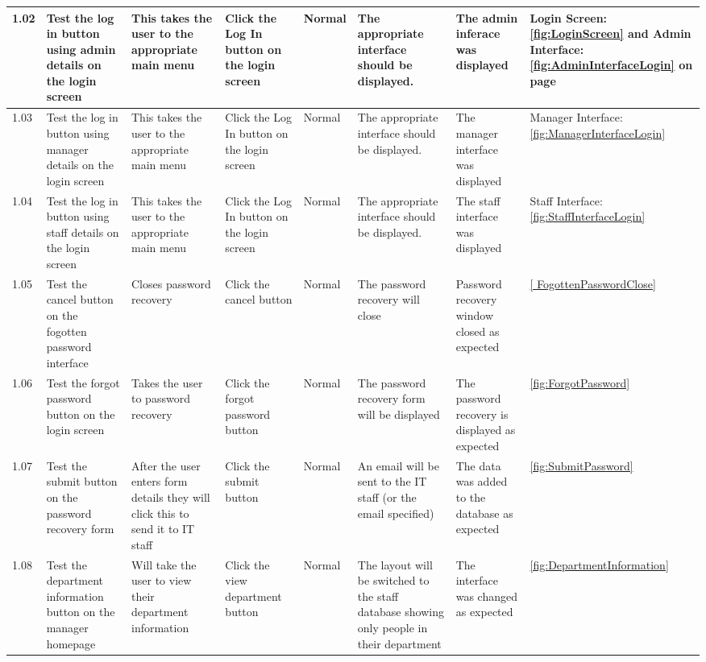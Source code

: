 \begin{landscape}
\begin{center}
\begin{longtable}{|p{1.5cm}|p{2cm}|p{2.5cm}|p{2cm}|p{2cm}|p{2cm}|p{3cm}|p{1.7cm}|}
\rowcolor{lightgray}1.02 & Test the log in button using admin details on the login screen  & This takes the user to the appropriate main menu & Click the Log In button on the login screen & Normal &  The appropriate interface should be displayed.&The admin inferace was displayed & Login Screen: \ref{fig:LoginScreen} and Admin Interface:  \ref{fig:AdminInterfaceLogin} on page \pageref{fig:LoginScreen} \\ \hline
\rowcolor{lightgray}1.03 & Test the log in button using manager details on the login screen  & This takes the user to the appropriate main menu & Click the Log In button on the login screen & Normal &  The appropriate interface should be displayed.& The manager interface was displayed & Manager Interface:  \ref{fig:ManagerInterfaceLogin}  \\ \hline
\rowcolor{lightgray}1.04 & Test the log in button using staff details on the login screen  & This takes the user to the appropriate main menu & Click the Log In button on the login screen & Normal &  The appropriate interface should be displayed.& The staff interface was displayed & Staff Interface:  \ref{fig:StaffInterfaceLogin}  \\ \hline
\rowcolor{lightgray}1.05 & Test the cancel button on the fogotten password interface & Closes password recovery & Click the cancel button & Normal & The password recovery will close & Password recovery window closed as expected & \ref{ FogottenPasswordClose}  \\ \hline
1.06 & Test the forgot password button on the login screen & Takes the user to password recovery & Click the forgot password button & Normal & The password recovery form will be displayed & The password recovery is displayed as expected& \ref{fig:ForgotPassword}  \\ \hline
1.07 & Test the submit button on the password recovery form & After the user enters form details they will click this to send it to IT staff & Click the submit button & Normal & An email will be sent to the IT staff (or the email specified) & The data was added to the database as expected &\ref{fig:SubmitPassword} \\ \hline
1.08 & Test the department information button on the manager homepage & Will take the user to view their department information & Click the view department button & Normal & The layout will be switched to the staff database showing only people in their department & The interface was changed as expected&  \ref {fig:DepartmentInformation}   \\ \hline


\end{longtable}
\end{center}
\end{landscape}
